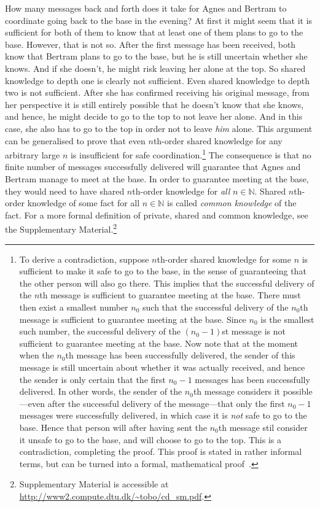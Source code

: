\documentclass[twocolumn,a4paper,superscriptaddress,nofootinbib]{revtex4}
\begin{document}
How many messages back and forth does it take for Agnes and Bertram to coordinate going back to the base in the evening? At first it might seem that it is sufficient for both of them to know that at least one of them plans to go to the base. However, that is not so. After the first message has been received, both know that Bertram plans to go to the base, but he is still uncertain whether she knows. And if she doesn't, he might risk leaving her alone at the top. So shared knowledge to depth one is clearly not sufficient. Even shared knowledge to depth two is not sufficient. After she has confirmed receiving his original message, from her perspective it is still entirely possible that he doesn't know that she knows, and hence, he might decide to go to the top to not leave her alone. And in this case, she also has to go to the top in order not to leave \emph{him} alone. This argument can be generalised to prove that even $n$th-order shared knowledge for any arbitrary large $n$ is insufficient for safe coordination.\footnote{To derive a contradiction, suppose $n$th-order shared knowledge for some $n$ is sufficient to make it safe to go to the base, in the sense of guaranteeing that the other person will also go there. This implies that the successful delivery of the $n$th message is sufficient to guarantee meeting at the base. There must then exist a smallest number $n_0$ such that the successful delivery of the $n_0$th message is sufficient to guarantee meeting at the base. Since $n_0$ is the smallest such number, the successful delivery of the $(n_0-1)$st message is not sufficient to guarantee meeting at the base. Now note that at the moment when the $n_0$th message has been successfully delivered, the sender of this message is still uncertain about whether it was actually received, and hence the sender is only certain that the first $n_0-1$ messages has been successfully delivered.  In other words, the sender of the $n_0$th message considers it possible---even after the successful delivery of the message---that only the first $n_0-1$ messages were successfully delivered, in which case it is \emph{not} safe to go to the base. Hence that person will after having sent the $n_0$th message stil consider it unsafe to go to the base, and will choose to go to the top. This is a contradiction, completing the proof. This proof is stated in rather informal terms, but can be turned into a formal, mathematical proof~\citep{fagin1995reasoning}.}  The consequence is that no finite number of messages successfully delivered will guarantee that Agnes and Bertram manage to meet at the base. In order to guarantee meeting at the base, they would need to have shared $n$th-order knowledge for \emph{all} $n \in \mathbb{N}$. Shared $n$th-order knowledge of some fact for all $n \in \mathbb{N}$ is called  \emph{common knowledge} of the fact. For a more formal definition of private, shared and common knowledge, see the Supplementary Material.\footnote{Supplementary Material is accessible at \url{http://www2.compute.dtu.dk/\~tobo/cd_sm.pdf}.}
\end{document}
